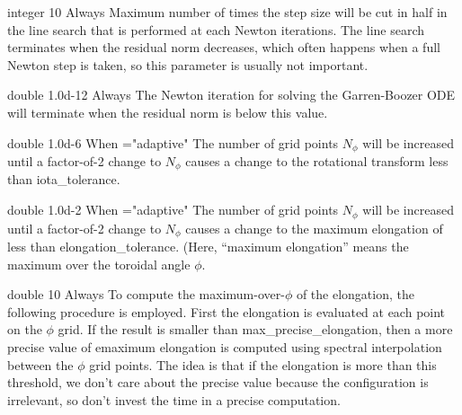 \myhrule

{integer}
{10}
{Always}
{Maximum number of times the step size will be cut in half in the line search that is performed at each Newton iterations. The line search terminates when the residual norm decreases, which often happens when a full Newton step is taken, so this parameter is usually not important.}

\myhrule

{double}
{1.0d-12}
{Always}
{The Newton iteration for solving the Garren-Boozer ODE will terminate when the residual norm is below this value.}

\myhrule

{double}
{1.0d-6}
{When ={\ttfamily "adaptive"}}
{The number of grid points $N_\phi$ will be increased until a factor-of-2 change to $N_\phi$ causes a change to the rotational transform less than {\ttfamily iota\_tolerance}.}

\myhrule

{double}
{1.0d-2}
{When ={\ttfamily "adaptive"}}
{The number of grid points $N_\phi$ will be increased until a factor-of-2 change to $N_\phi$ causes a change to the maximum elongation of less than {\ttfamily elongation\_tolerance}. (Here, ``maximum elongation'' means the maximum over the toroidal angle $\phi$.}

\myhrule

{double}
{10}
{Always}
{To compute the maximum-over-$\phi$ of the elongation, the following procedure is employed. First the elongation is evaluated at each point on the $\phi$ grid. If the result is smaller than {\ttfamily max\_precise\_elongation}, then a more precise value of emaximum elongation is computed using spectral interpolation between the $\phi$ grid points. The idea is that if the elongation is more than this threshold, we don't care about the precise value because the configuration is irrelevant, so don't invest the time in a precise computation.}

\myhrule

